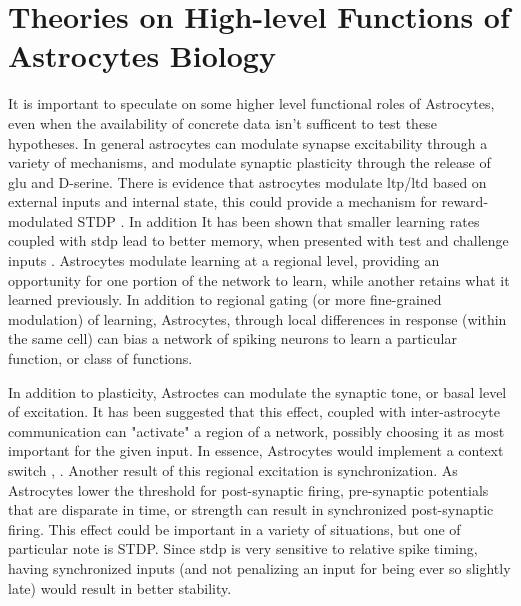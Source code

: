     
    \section{Theories on High-level Functions of Astrocytes Biology}
    
    It is important to speculate on some higher level functional roles of
    Astrocytes, even when the availability of concrete data isn't sufficent to
    test these hypotheses. In general astrocytes can modulate synapse
    excitability through a variety of mechanisms, and modulate synaptic
    plasticity through the release of \Gls{glu} and D-serine. There is evidence
    that astrocytes modulate \Gls{ltp}/\Gls{ltd} based on external inputs and internal
    state, this could provide a mechanism for reward-modulated STDP
    \parencite{min_2012}. In addition It has been shown that smaller learning rates
    coupled with \Gls{stdp} lead to better memory, when presented with test and
    challenge inputs \parencite{van-rossum_2012}. Astrocytes modulate learning at a
    regional level, providing an opportunity for one portion of the network to
    learn, while another retains what it learned previously. In addition to
    regional gating (or more fine-grained modulation) of learning, Astrocytes,
    through local differences in response (within the same cell) can bias a
    network of spiking neurons to learn a particular function, or class of
    functions.

    In addition to plasticity, Astroctes can modulate the synaptic tone, or
    basal level of excitation. It has been suggested that this effect, coupled
    with inter-astrocyte communication can "activate" a region of a network,
    possibly choosing it as most important for the given input. In essence,
    Astrocytes would implement a context switch \parencite{min_2012},
    \parencite{gordleeva_2021}. Another result of this regional excitation is
    synchronization. As Astrocytes lower the threshold for post-synaptic firing,
    pre-synaptic potentials that are disparate in time, or strength can result
    in synchronized post-synaptic firing. This effect could be important in a
    variety of situations, but one of particular note is STDP. Since \Gls{stdp} is
    very sensitive to relative spike timing, having synchronized inputs (and not
    penalizing an input for being ever so slightly late) would result in better
    stability.

